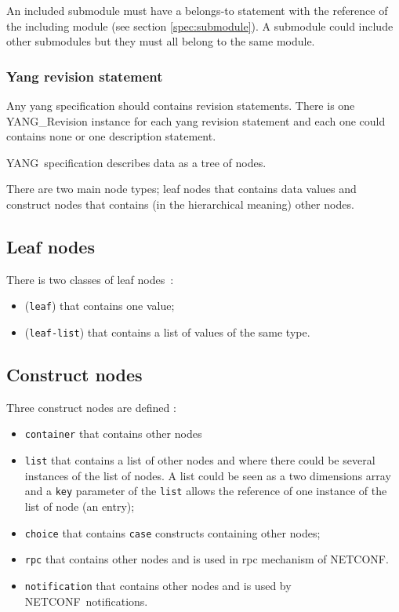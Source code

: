 \documentclass[a4paper]{article}
\newcommand{\nc}{NETCONF}
\newcommand{\y}{YANG}
\begin{document}
An  included  submodule must  have  a  belongs-to  statement with  the
reference of the including module (see section \ref{spec:submodule}).  A
submodule could include  other submodules but they must  all belong to
the same module.



\subsubsection{Yang revision statement}

Any yang specification should  contains revision statements.  There is
one YANG\_Re\-vi\-si\-on  instance for each yang  revision statement and
each one could contains none or one description statement.




\y\ specification describes data as a tree of  nodes. 


There are two main node types; leaf
nodes that contains data values  and construct nodes that contains (in
the hierarchical meaning) other nodes.

\subsection{Leaf nodes}

There is two classes of leaf nodes~:
\begin{itemize}
\item
({\tt leaf}) that contains one value;
\item
({\tt leaf-list}) that contains a list of values of the same
type.
\end{itemize}

\subsection{Construct nodes}

Three construct nodes are defined : 
\begin{itemize}
\item
{\tt container} that contains other nodes
\item
{\tt list} that  contains a list of other nodes  and where there could
be several instances of  the list of nodes. A list could  be seen as a
two  dimensions array  and a  {\tt key}  parameter of  the  {\tt list}
allows the reference of one instance of the list of node (an entry);
\item
{\tt  choice} that  contains  {\tt case}  constructs containing  other
nodes;
\item
{\tt rpc} that contains other nodes and is used in rpc mechanism of
\nc.
\item
{\tt  notification} that  contains other  nodes  and is  used by  \nc\
notifications.
\end{itemize}
\end{document}
